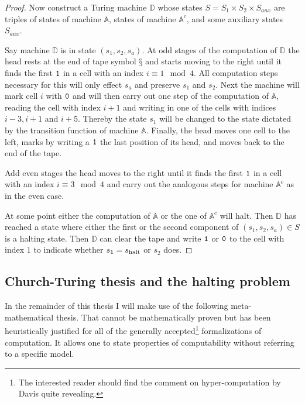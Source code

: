 \begin{proof}
  Now construct a Turing machine \(\mathbb{D}\) whose states \(S = S_1 \times
  S_2 \times S_{aux}\) are triples of states of machine \(\mathbb{A}\), states
  of machine \(\mathbb{A}^c\), and some auxiliary states \(S_{aux}\).

  Say machine \(\mathbb{D}\) is in state \((s_1, s_2, s_a)\). At odd stages of
  the computation of \(\mathbb{D}\) the head rests at the end of tape symbol
  \(§\) and starts moving to the right until it finds the first \(\mathtt{1}\) in a
  cell with an index \(i \equiv 1 \mod 4\). All computation steps necessary for
  this will only effect \(s_a\) and preserve \(s_1\) and \(s_2\).
  Next the machine will mark cell \(i\) with \(\mathtt{0}\) and will then carry out
  one step of the computation of \(\mathbb{A}\), reading the cell with index \(i
  + 1\) and writing in one of the cells with indices \(i - 3, i + 1\) and \(i +
  5\). Thereby the state \(s_1\) will be changed to the state dictated by the
  transition function of machine \(\mathbb{A}\).
  Finally, the head moves one cell to the left, marks by writing a \(\mathtt{1}\) the
  last position of its head, and moves back to the end of the tape.

  Add even stages the head moves to the right until it finds the first \(\mathtt{1}\)
  in a cell with an index \(i \equiv 3 \mod 4\) and carry out the analogous
  steps for machine \(\mathbb{A}^c\) as in the even case.

  At some point either the computation of \(\mathbb{A}\) or the one of
  \(\mathbb{A}^c\) will halt. Then \(\mathbb{D}\) has reached a state where
  either the first or the second component of \((s_1, s_2, s_a) ∈ S\) is a
  halting state. Then \(\mathbb{D}\) can clear the tape and write \(\mathtt{1}\) or
  \(\mathtt{0}\) to the cell with index \(1\) to indicate whether \(s_1 = s_{\text{halt}}\) or
  \(s_2\) does.
\end{proof}

\subsection{Church-Turing thesis and the halting problem}

In the remainder of this thesis I will make use of the following
meta-mathematical thesis. That cannot be mathematically proven but has been
heuristically justified for all of the generally accepted\footnote{The
interested reader should find the comment \cite{Davis2006} on hyper-computation
by Davis quite revealing.} formalizations of computation. It allows one to state
properties of computability without referring to a specific model.

